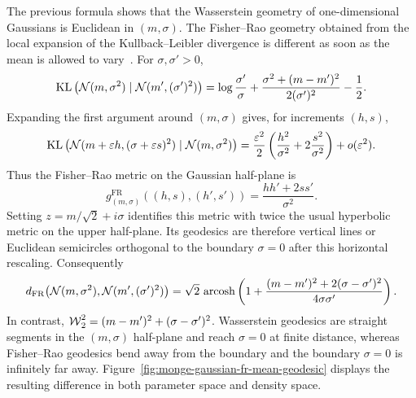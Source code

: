 \begin{rem}\label{rem-fisher-rao-gaussian-mean}
	The previous formula shows that the Wasserstein geometry of one-dimensional Gaussians is Euclidean in $(m,\sigma)$. The Fisher--Rao geometry obtained from the local expansion of the Kullback--Leibler divergence is different as soon as the mean is allowed to vary~\cite{costa2015fisher}. For $\sigma,\sigma'>0$,
	\[
		\operatorname{KL}\big(\mathcal{N}(m,\sigma^2)\mid\mathcal{N}(m',(\sigma')^2)\big)
		=
		\log\frac{\sigma'}{\sigma}
		+
		\frac{\sigma^2+(m-m')^2}{2(\sigma')^2}
		-
		\frac12.
	\]
	Expanding the first argument around $(m,\sigma)$ gives, for increments $(h,s)$,
	\[
		\operatorname{KL}\big(\mathcal{N}(m+\varepsilon h,(\sigma+\varepsilon s)^2)
		\mid \mathcal{N}(m,\sigma^2)\big)
		=
		\frac{\varepsilon^2}{2}
		\left(\frac{h^2}{\sigma^2}+2\frac{s^2}{\sigma^2}\right)
		+o(\varepsilon^2).
	\]
	Thus the Fisher--Rao metric on the Gaussian half-plane is
	\[
		g_{(m,\sigma)}^{\mathrm{FR}}((h,s),(h',s'))
		=
		\frac{hh'+2ss'}{\sigma^2}.
	\]
	Setting $z=m/\sqrt2+i\sigma$ identifies this metric with twice the usual hyperbolic metric on the upper half-plane. Its geodesics are therefore vertical lines or Euclidean semicircles orthogonal to the boundary $\sigma=0$ after this horizontal rescaling. Consequently
	\[
		d_{\mathrm{FR}}\big(\mathcal{N}(m,\sigma^2),\mathcal{N}(m',(\sigma')^2)\big)
		=
		\sqrt2\,\operatorname{arcosh}\left(
		1+\frac{(m-m')^2+2(\sigma-\sigma')^2}{4\sigma\sigma'}
		\right).
	\]
	In contrast, $\operatorname{\mathcal{W}}_2^2=(m-m')^2+(\sigma-\sigma')^2$. Wasserstein geodesics are straight segments in the $(m,\sigma)$ half-plane and reach $\sigma=0$ at finite distance, whereas Fisher--Rao geodesics bend away from the boundary and the boundary $\sigma=0$ is infinitely far away. Figure~\ref{fig:monge-gaussian-fr-mean-geodesic} displays the resulting difference in both parameter space and density space.
\end{rem}

